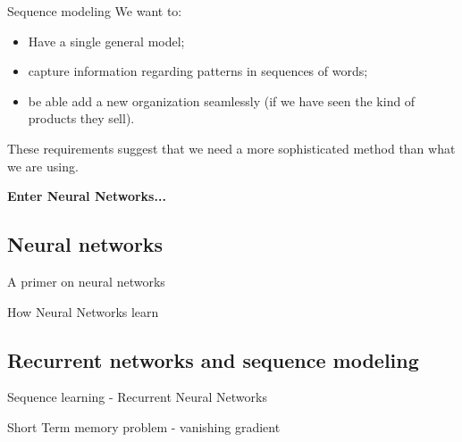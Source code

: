\documentclass[9pt]{beamer}
\begin{document}
\begin{frame}{Sequence modeling}
	We want to:
	\begin{itemize}
		\item Have a single general model;
		\item capture information regarding patterns in sequences of words;
		\item be able add a new organization seamlessly (if we have seen the kind of products they sell).
	\end{itemize}
	\vspace{0.5cm}
	These requirements suggest that we need a more sophisticated method than what we are using.
	
	\pause
	\vspace{1cm}
	\begin{center}
		\Large{\textbf{Enter Neural Networks...}}
	\end{center}
	
\end{frame}

\subsection{Neural networks}
\begin{frame}{A primer on neural networks}

\end{frame}

\begin{frame}{How Neural Networks learn}

\end{frame}


\subsection{Recurrent networks and sequence modeling}

\begin{frame}{Sequence learning - Recurrent Neural Networks}

\end{frame}

\begin{frame}{Short Term memory problem - vanishing gradient}

\end{frame}
\end{document}
